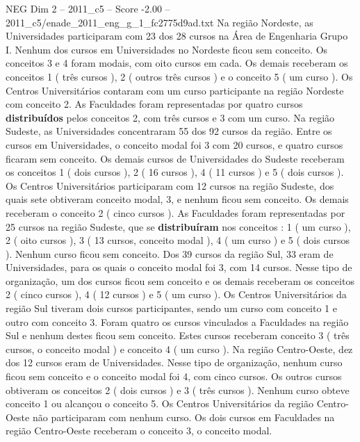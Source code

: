 \begin{textsample}{NEG Dim 2 – 2011\_c5 – Score -2.00 – 2011\_c5/enade\_2011\_eng\_g\_1\_fc2775d9ad.txt}
Na região Nordeste, as Universidades participaram com 23 dos 28 cursos na Área de Engenharia Grupo I.
Nenhum dos cursos em Universidades no Nordeste ficou sem conceito.
Os conceitos 3 e 4 foram modais, com oito cursos em cada.
Os demais receberam os conceitos 1 ( três cursos ), 2 ( outros três cursos ) e o conceito 5 ( um curso ).
Os Centros Universitários contaram com um curso participante na região Nordeste com conceito 2.
As Faculdades foram representadas por quatro cursos \textbf{distribuídos} pelos conceitos 2, com três cursos e 3 com um curso.
Na região Sudeste, as Universidades concentraram 55 dos 92 cursos da região.
Entre os cursos em Universidades, o conceito modal foi 3 com 20 cursos, e quatro cursos ficaram sem conceito.
Os demais cursos de Universidades do Sudeste receberam os conceitos 1 ( dois cursos ), 2 ( 16 cursos ), 4 ( 11 cursos ) e 5 ( dois cursos ).
Os Centros Universitários participaram com 12 cursos na região Sudeste, dos quais sete obtiveram conceito modal, 3, e nenhum ficou sem conceito.
Os demais receberam o conceito 2 ( cinco cursos ).
As Faculdades foram representadas por 25 cursos na região Sudeste, que se \textbf{distribuíram} nos conceitos : 1 ( um curso ), 2 ( oito cursos ), 3 ( 13 cursos, conceito modal ), 4 ( um curso ) e 5 ( dois cursos ).
Nenhum curso ficou sem conceito.
Dos 39 cursos da região Sul, 33 eram de Universidades, para os quais o conceito modal foi 3, com 14 cursos.
Nesse tipo de organização, um dos cursos ficou sem conceito e os demais receberam os conceitos 2 ( cinco cursos ), 4 ( 12 cursos ) e 5 ( um curso ).
Os Centros Universitários da região Sul tiveram dois cursos participantes, sendo um curso com conceito 1 e outro com conceito 3.
Foram quatro os cursos vinculados a Faculdades na região Sul e nenhum destes ficou sem conceito.
Estes cursos receberam conceito 3 ( três cursos, o conceito modal ) e conceito 4 ( um curso ).
Na região Centro-Oeste, dez dos 12 cursos eram de Universidades.
Nesse tipo de organização, nenhum curso ficou sem conceito e o conceito modal foi 4, com cinco cursos.
Os outros cursos obtiveram os conceitos 2 ( dois cursos ) e 3 ( três cursos ).
Nenhum curso obteve conceito 1 ou alcançou o conceito 5.
Os Centros Universitários da região Centro-Oeste não participaram com nenhum curso.
Os dois cursos em Faculdades na região Centro-Oeste receberam o conceito 3, o conceito modal.

\end{textsample}
